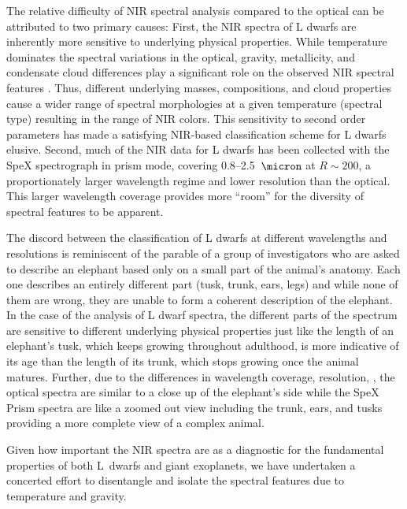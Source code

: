 \documentclass[modern]{aastex61}
\begin{document}
The relative difficulty of NIR spectral analysis compared to the optical can be attributed to two primary causes:
First, the NIR spectra of L dwarfs are inherently more sensitive to underlying physical properties.
While temperature dominates the spectral variations in the optical, gravity, metallicity, and condensate cloud differences play a significant role on the observed NIR spectral features \citep{Jones:1997hb,Knapp04}.
Thus, different underlying masses, compositions, and cloud properties cause a wider range of spectral morphologies at a given temperature (spectral type) resulting in the range of NIR colors.
This sensitivity to second order parameters has made a satisfying NIR-based classification scheme for L dwarfs elusive.
Second, much of the NIR data for L dwarfs has been collected with the SpeX spectrograph in prism mode, covering 0.8--2.5~$\micron$ at $R\sim200$, a proportionately larger wavelength regime and lower resolution than the optical.
This larger wavelength coverage provides more ``room'' for the diversity of spectral features to be apparent.

The discord between the classification of L dwarfs at different wavelengths and resolutions is reminiscent of the parable of a group of investigators who are asked to describe an elephant based only on a small part of the animal's anatomy.
Each one describes an entirely different part (tusk, trunk, ears, legs) and while none of them are wrong, they are unable to form a coherent description of the elephant.
In the case of the analysis of L dwarf spectra, the different parts of the spectrum are sensitive to different underlying physical properties just like the length of an elephant's tusk, which keeps growing throughout adulthood, is more indicative of its age than the length of its trunk, which stops growing once the animal matures.
Further, due to the differences in wavelength coverage, resolution, , the optical spectra are similar to a close up of the elephant's side while the SpeX Prism spectra are like a zoomed out view including the trunk, ears, and tusks providing a more complete view of a complex animal.

Given how important the NIR spectra are as a diagnostic for the fundamental properties of both L~dwarfs and giant exoplanets, we have undertaken a concerted effort to disentangle and isolate the spectral features due to temperature and gravity.
\end{document}
